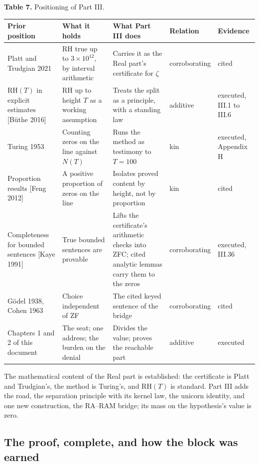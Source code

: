 \documentclass[10pt,twocolumn]{article}
\begin{document}
\begin{table}[!t]
\centering\small
\renewcommand{\arraystretch}{1.12}
\raggedright \textbf{Table 7.} Positioning of Part III.\par\smallskip
\begin{tabularx}{\textwidth}{@{}P{0.18\textwidth} P{0.19\textwidth} L P{0.115\textwidth} P{0.115\textwidth}@{}}
\toprule
\textbf{Prior position} & \textbf{What it holds} & \textbf{What Part III does} & \textbf{Relation} & \textbf{Evidence} \\
\midrule
Platt and Trudgian 2021 & RH true up to \(3 \times 10^{12}\), by interval arithmetic & Carries it as the Real part's certificate for \(\zeta\) & corroborating & cited \\
\(\mathrm{RH}(T)\) in explicit estimates {[}Büthe 2016{]} & RH up to height \(T\) as a working assumption & Treats the split as a principle, with a standing law & additive & executed, III.1 to III.6 \\
Turing 1953 & Counting zeros on the line against \(N(T)\) & Runs the method as testimony to \(T = 100\) & kin & executed, Appendix H \\
Proportion results {[}Feng 2012{]} & A positive proportion of zeros on the line & Isolates proved content by height, not by proportion & kin & cited \\
Completeness for bounded sentences {[}Kaye 1991{]} & True bounded sentences are provable & Lifts the certificate's arithmetic checks into ZFC; cited analytic lemmas carry them to the zeros & corroborating & executed, III.36 \\
Gödel 1938, Cohen 1963 & Choice independent of ZF & The cited keyed sentence of the bridge & corroborating & cited \\
Chapters 1 and 2 of this document & The seat; one address; the burden on the denial & Divides the value; proves the reachable part & additive & executed \\
\bottomrule
\end{tabularx}
\end{table}

The mathematical content of the Real part is established: the
certificate is Platt and Trudgian's, the method is Turing's, and
\(\mathrm{RH}(T)\) is standard. Part III adds the road, the separation
principle with its kernel law, the unicorn identity, and one new
construction, the RA--RAM bridge; its mass on the hypothesis's value is
zero.

\hypertarget{the-proof-complete-and-how-the-block-was-earned}{%
\subsection{The proof, complete, and how the block was
earned}\label{the-proof-complete-and-how-the-block-was-earned}}
\end{document}
